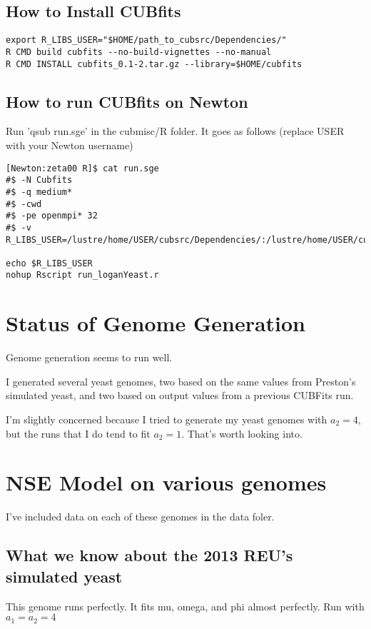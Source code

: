 \subsection{How to Install CUBfits}

\begin{verbatim}
export R_LIBS_USER="$HOME/path_to_cubsrc/Dependencies/"
R CMD build cubfits --no-build-vignettes --no-manual
R CMD INSTALL cubfits_0.1-2.tar.gz --library=$HOME/cubfits
\end{verbatim}

\subsection{How to run CUBfits on Newton}

Run 'qsub run.sge' in the cubmisc/R folder. It goes as follows (replace USER with your Newton username)
\begin{verbatim}
[Newton:zeta00 R]$ cat run.sge
#$ -N Cubfits
#$ -q medium*
#$ -cwd
#$ -pe openmpi* 32
#$ -v R_LIBS_USER=/lustre/home/USER/cubsrc/Dependencies/:/lustre/home/USER/cubfits

echo $R_LIBS_USER
nohup Rscript run_loganYeast.r
\end{verbatim}


\section{Status of Genome Generation}

Genome generation seems to run well.

I generated several yeast genomes, two based on the same values from Preston's simulated yeast, and two based on output values from a previous CUBFits run. 

I'm slightly concerned because I tried to generate my yeast genomes with $a_2=4$, but the runs that I do tend to fit $a_2=1$. That's worth looking into.

\section{NSE Model on various genomes}
I've included data on each of these genomes in the data foler.

\subsection{What we know about the 2013 REU's simulated yeast}
This genome runs perfectly. It fits mu, omega, and phi almost perfectly. Run with $a_1=a_2=4$


